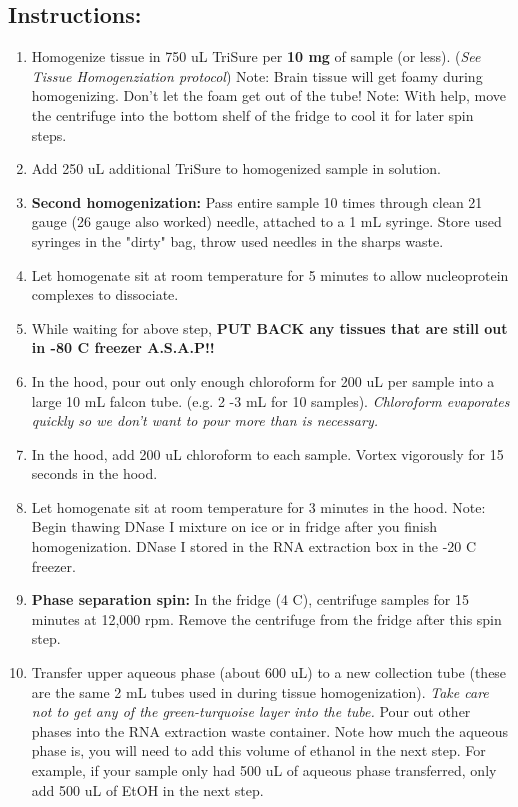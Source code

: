 \documentclass[a4paper,12pt,twoside]{book}
\begin{document}
 \subsection*{Instructions:}
\begin{enumerate}
	\item Homogenize tissue in 750 uL TriSure per {\bf 10 mg} of sample (or less). ({\em See Tissue Homogenziation protocol}) 
	\subitem Note: Brain tissue will get foamy during homogenizing. Don't let the foam get out of the tube! 
	\subitem Note: With help, move the centrifuge into the bottom shelf of the fridge to cool it for later spin steps. 
	\item Add 250 uL additional TriSure to homogenized sample in solution. 
	\item {\bf Second homogenization:} Pass entire sample 10 times through clean 21 gauge (26 gauge also worked) needle, attached to a 1 mL syringe. Store used syringes in the "dirty" bag, throw used needles in the sharps waste. 
	\item Let homogenate sit at room temperature for 5 minutes to allow nucleoprotein complexes to dissociate. 
	\item While waiting for above step, {\bf PUT BACK any tissues that are still out in -80 C freezer A.S.A.P!!}
	\item In the hood, pour out only enough chloroform for 200 uL per sample into a large 10 mL falcon tube. (e.g. 2 -3 mL for 10 samples). {\em Chloroform evaporates quickly so we don't want to pour more than is necessary.}
	\item  In the hood, add 200 uL chloroform to each sample. Vortex vigorously for 15 seconds in the hood. 
	\item Let homogenate sit at room temperature for 3 minutes in the hood. 
	\subitem Note: Begin thawing DNase I mixture on ice or in fridge after you finish homogenization. DNase I stored in the RNA extraction box in the -20 C freezer. 
	\item {\bf Phase separation spin:}  In the fridge (4 C), centrifuge samples for 15 minutes at 12,000 rpm.  Remove the centrifuge from the fridge after this spin step. 
	\item  Transfer upper aqueous phase (about 600 uL) to a new collection tube (these are the same 2 mL tubes used in during tissue homogenization). {\em Take care not to get any of the green-turquoise layer into the  tube.}  Pour out other phases into the RNA extraction waste container. 
	\subitem Note how much the aqueous phase is, you will need to add this volume of ethanol in the next step. For example, if your sample only had 500 uL of aqueous phase transferred, only add 500 uL of EtOH in the next step. 

\end{enumerate}
\end{document}
